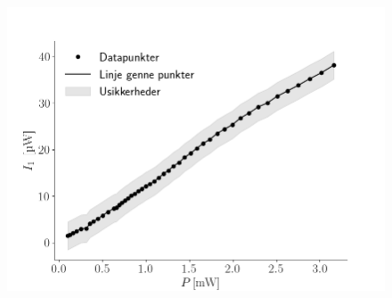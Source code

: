 \documentclass[main]{subfiles}
\begin{document}

\begin{figure}[H]
    \centering
    \includegraphics[width=\linewidth]{tegninger/graf2.png}
    \caption{}
    \label{fig:graf2}
\end{figure}
\end{document}
